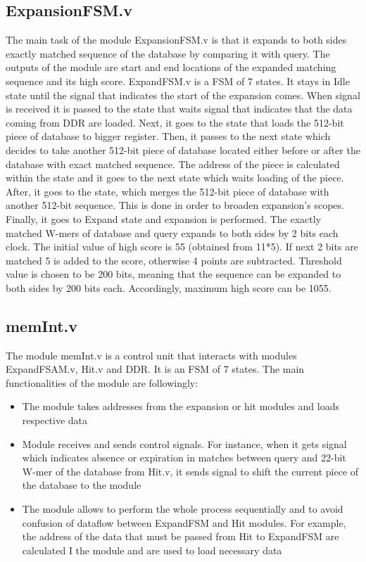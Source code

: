 \subsection{ExpansionFSM.v}
The main task of the module ExpansionFSM.v is that it expands to both sides exactly matched sequence of the database by comparing it with query. The outputs of the module are start and end locations of the expanded matching sequence and its high score. ExpandFSM.v is a FSM of 7 states. It stays in Idle state until the signal that indicates the start of the expansion comes. When signal is received it is passed to the state that waits signal that indicates that the data coming from DDR are loaded. Next, it goes to the state that loads the 512-bit piece of database to bigger register. Then, it passes to the next state which decides to take another 512-bit piece of database located either before or after the database with exact matched sequence. The address of the piece is calculated within the state and it goes to the next state which waits loading of the piece. After, it goes to the state, which merges the 512-bit piece of database with another 512-bit sequence. This is done in order to broaden expansion’s scopes. Finally, it goes to Expand state and expansion is performed. The exactly matched W-mers of database and query expands to both sides by 2 bits each clock. The initial value of high score is 55 (obtained from 11*5). If next 2 bits are matched 5 is added to the score, otherwise 4 points are subtracted. Threshold value is chosen to be 200 bits, meaning that the sequence can be expanded to both sides by 200 bits each. Accordingly, maximum high score can be 1055. 
\subsection{memInt.v }
The module memInt.v is a control unit that interacts with modules ExpandFSAM.v, Hit.v and DDR. It is an FSM of 7 states. The main functionalities of the module are followingly:
\begin{itemize}
\item The module takes addresses from the expansion or hit modules and loads respective data
\item Module receives and sends control signals. For instance, when it gets signal which indicates absence or expiration in matches between query and 22-bit W-mer of the database from Hit.v, it sends signal to shift the current piece of the database to the module
\item The module allows to perform the whole process sequentially and to avoid confusion of dataflow between ExpandFSM and Hit modules. For example, the address of the data that must be passed from Hit to ExpandFSM are calculated I the module and are used to load necessary data
\end{itemize}